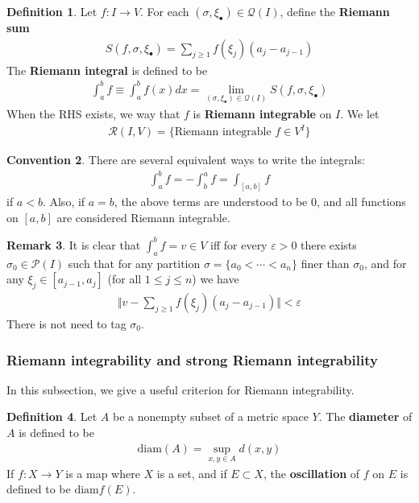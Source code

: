 \documentclass[12pt,b5paper,notitlepage]{article}
\theoremstyle{definition}
\newtheorem{df}{Definition}[section]
\newtheorem{rem}[df]{Remark}
\newtheorem{cv}[df]{Convention}
\theoremstyle{plain}
\newcommand{\mc}{\mathcal}
\newcommand{\scr}{\mathscr}
\newcommand{\blt}{\bullet}
\newcommand{\diam}{\mathrm{diam}}
\newcommand{\eps}{\varepsilon}
\numberwithin{equation}{section}
\begin{document}
\begin{df}
Let $f:I\rightarrow V$. For each $(\sigma,\xi_\blt)\in\mc Q(I)$, define the \textbf{Riemann sum} \index{Sf@$S(f,\sigma,\xi_\blt)$}
\begin{align*}
S(f,\sigma,\xi_\blt)=\sum_{j\geq 1}f(\xi_j)(a_j-a_{j-1})
\end{align*}
The \textbf{Riemann integral}  is defined to be
\begin{align*}
\int_a^b f\equiv\int_a^b f(x)dx=\lim_{(\sigma,\xi_\blt)\in\mc Q(I)}S(f,\sigma,\xi_\blt)
\end{align*}
When the RHS exists, we way that $f$ is \textbf{Riemann integrable}  on $I$. We let 
\begin{align*}
\scr R(I,V)=\{\text{Riemann integrable }f\in V^I\}
\end{align*}
\end{df}


\begin{cv}\label{lb381}
There are several equivalent ways to write the integrals:
\begin{align*}
\int_a^b f=-\int_b^a f=\int_{[a,b]}f
\end{align*}
if $a<b$. Also, if $a=b$, the above terms are understood to be $0$,  and all functions on $[a,b]$ are considered Riemann integrable.
\end{cv}


\begin{rem}
It is clear that $\int_a^b f=v\in V$ iff for every $\eps>0$ there exists $\sigma_0\in \mc P(I)$ such that for any partition $\sigma=\{a_0<\cdots<a_n\}$ finer than $\sigma_0$, and for any $\xi_j\in[a_{j-1},a_j]$ (for all $1\leq j\leq n$) we have
\begin{align*}
\Big\Vert v-\sum_{j\geq 1}f(\xi_j)(a_j-a_{j-1})  \Big\Vert<\eps
\end{align*}
There is not need to tag $\sigma_0$.
\end{rem}




\subsubsection{Riemann integrability and strong Riemann integrability}

In this subsection, we give a useful criterion for Riemann integrability.


\begin{df}
Let $A$ be a nonempty subset of a metric space $Y$. The \textbf{diameter} of $A$ is defined to be \index{diam@$\diam(A)$}
\begin{align*}
\diam(A)=\sup_{x,y\in A}d(x,y)
\end{align*}
If $f:X\rightarrow Y$ is a map where $X$ is a set, and if $E\subset X$, the \textbf{oscillation}  of $f$ on $E$ is defined to be $\diam f(E)$.
\end{df}
\end{document}

